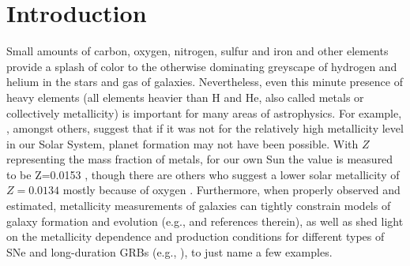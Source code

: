 \documentclass{emulateapj}
\begin{document}
\section{Introduction}
Small amounts of carbon, oxygen, nitrogen, sulfur and iron and
 other elements provide a splash of color to the otherwise dominating greyscape of hydrogen and helium in the stars and gas of galaxies. Nevertheless, even this 
minute presence of heavy elements (all elements heavier than H and He, also called metals or collectively metallicity) is important for many areas of astrophysics. For example, \citet{johnson12}, amongst others, 
suggest that if it was not for the relatively high metallicity level in our Solar System, planet formation may not have been possible. With $Z$ representing the mass fraction of metals, for our own Sun the value is measured to be  Z=0.0153 \citep{chaffau11}, though there are others who suggest a lower solar metallicity of $Z=0.0134$ mostly because of oxygen \citep{asplund09_rev,grevesse10}.%
Furthermore, when properly observed and estimated, metallicity measurements of galaxies can tightly constrain models of galaxy formation and evolution (e.g., \citealt{kewley08} and references therein), as well as shed light on the metallicity dependence and production conditions for different types of SNe and long-duration GRBs (e.g., \citealt{modjaz08_Z,levesque10_grbhosts,anderson10,modjaz11,kelly12,sanders12,lunnan14,leloudas14,pan15}), to just name a few examples.
\end{document}
